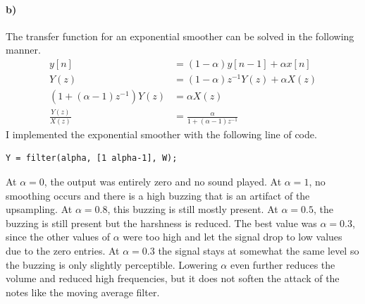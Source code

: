 \documentclass[12pt]{article}
\begin{document}
\paragraph{b)}

The transfer function for an exponential smoother can be solved in the following manner.
\begin{align*}
    y[n]&=(1-\alpha)y[n-1]+\alpha x[n]\\
    Y(z)&=(1-\alpha)z^{-1}Y(z)+\alpha X(z)\\
    (1+(\alpha-1)z^{-1})Y(z)&=\alpha X(z)\\
    \frac{Y(z)}{X(z)}&=\frac{\alpha}{1+(\alpha-1) z^{-1}}
\end{align*}
I implemented the exponential smoother with the following line of code.
\begin{verbatim}
Y = filter(alpha, [1 alpha-1], W);
\end{verbatim}
At \(\alpha=0\), the output was entirely zero and no sound played. At \(\alpha=1\), no
smoothing occurs and there is a high buzzing that is an artifact of the upsampling. At \(\alpha=0.8\),
this buzzing is still mostly present. At \(\alpha=0.5\), the buzzing is still present but the harshness
is reduced. The best value was \(\alpha=0.3\), since the other values of \(\alpha\) were too high
and let the signal drop to low values due to the zero entries. At \(\alpha=0.3\) the signal stays
at somewhat the same level so the buzzing is only slightly perceptible. Lowering \(\alpha\) even
further reduces the volume and reduced high frequencies, but it does not soften the attack of the notes
like the moving average filter.
\end{document}
